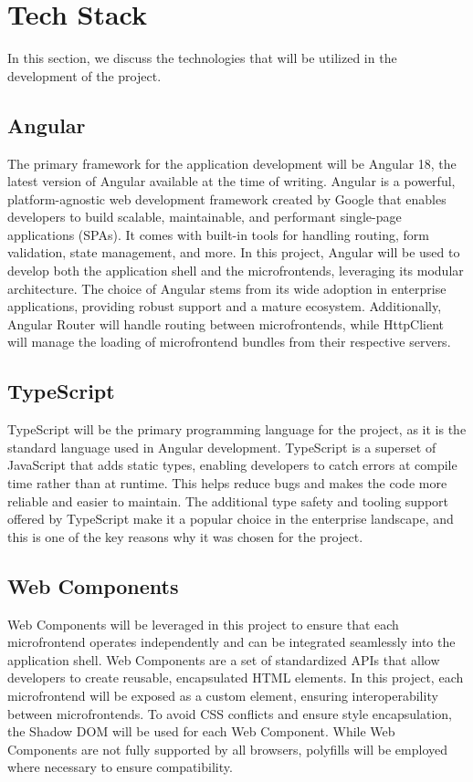 \section{Tech Stack}
In this section, we discuss the technologies that will be utilized in the development of the project.

\subsection{Angular}
The primary framework for the application development will be Angular 18, the latest version of Angular available at the time of writing. Angular is a powerful, platform-agnostic web development framework created by Google that enables developers to build scalable, maintainable, and performant single-page applications (SPAs). It comes with built-in tools for handling routing, form validation, state management, and more. In this project, Angular will be used to develop both the application shell and the microfrontends, leveraging its modular architecture. The choice of Angular stems from its wide adoption in enterprise applications, providing robust support and a mature ecosystem. Additionally, Angular Router will handle routing between microfrontends, while HttpClient will manage the loading of microfrontend bundles from their respective servers.

\subsection{TypeScript}
TypeScript will be the primary programming language for the project, as it is the standard language used in Angular development. TypeScript is a superset of JavaScript that adds static types, enabling developers to catch errors at compile time rather than at runtime. This helps reduce bugs and makes the code more reliable and easier to maintain. The additional type safety and tooling support offered by TypeScript make it a popular choice in the enterprise landscape, and this is one of the key reasons why it was chosen for the project.

\subsection{Web Components}
Web Components will be leveraged in this project to ensure that each microfrontend operates independently and can be integrated seamlessly into the application shell. Web Components are a set of standardized APIs that allow developers to create reusable, encapsulated HTML elements. In this project, each microfrontend will be exposed as a custom element, ensuring interoperability between microfrontends. To avoid CSS conflicts and ensure style encapsulation, the Shadow DOM will be used for each Web Component. While Web Components are not fully supported by all browsers, polyfills will be employed where necessary to ensure compatibility.

